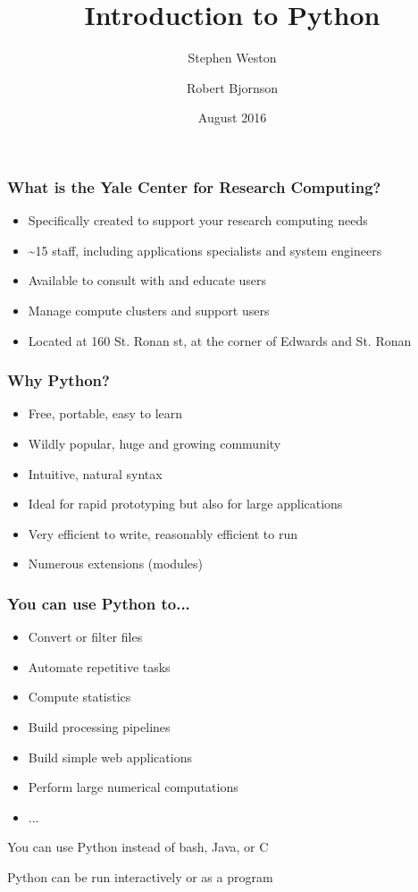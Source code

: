 \documentclass[10pt]{beamer}
\title{Introduction to Python}
\author{{Stephen Weston} \and {Robert Bjornson}}
\institute[Yale]{
  Yale Center for Research Computing \\
  Yale University
}
\date{August 2016}
\begin{document}
\begin{frame}[plain]
  \titlepage
\end{frame}

\begin{frame}[fragile]
\frametitle{What is the Yale Center for Research Computing?}

\begin{itemize}
\item Specifically created to support your research computing needs
\item \textasciitilde 15 staff, including applications specialists and system engineers
\item Available to consult with and educate users
\item Manage compute clusters and support users
\item Located at 160 St. Ronan st, at the corner of Edwards and St. Ronan
\end{itemize}

\end{frame}

\begin{frame}
\frametitle{Why Python?}

\begin{itemize}
\item Free, portable, easy to learn
\item Wildly popular, huge and growing community
\item Intuitive, natural syntax
\item Ideal for rapid prototyping but also for large applications
\item Very efficient to write, reasonably efficient to run
\item Numerous extensions (modules)
\end{itemize}
\end{frame}

\begin{frame}
\frametitle{You can use Python to...}
\begin{itemize}
\item Convert or filter files
\item Automate repetitive tasks
\item Compute statistics
\item Build processing pipelines
\item Build simple web applications
\item Perform large numerical computations
\item ...
\end{itemize}

You can use Python instead of bash, Java, or C
\vspace{2mm}

Python can be run interactively or as a program
\end{frame}
\end{document}
